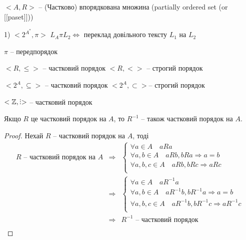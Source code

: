 $<A, R>$ -- (Частково) впорядкована множина (partially ordered set (or [[paset]]))

\begin{example}
    1) $<2^{A^*}, \pi>$ $L_A \pi L_2 \Leftrightarrow$ переклад
    довільного тексту $L_1$ на $L_2$

    $\pi$ -- передпорядок
\end{example}

\begin{example} 
    $<R, \leqslant>$ -- частковий порядок
    $<R, <>$ -- строгий порядок
\end{example}

\begin{example}
    $<2^{A}, \subseteq>$ -- частковий порядок
    $<2^{A}, \subset>$-- строгий порядок
\end{example}

\begin{example}
    $<\mathbb{Z}, \divby>$ -- частковий порядок
\end{example}

\begin{claim}
    Якщо $R$ це частковий порядок на $A$, то $R^{-1}$
    -- також частковий порядок на $A$.
\end{claim}
\begin{proof}
    Нехай $R$ -- частковий порядок на $A$, тоді
    $$\begin{array}{rcl}
        R \text{ -- частковий порядок на } A
        & \Rightarrow & \left\{ \begin{array}{l}
            \forall a \in A \quad aRa \\
            \forall a, b \in A \quad aRb, bRa \Rightarrow a = b \\
            \forall a, b, c \in A \quad aRb, bRc \Rightarrow aRc \\
        \end{array} \right.  \\
        & \Rightarrow & \left\{ \begin{array}{l}
            \forall a \in A \quad aR^{-1}a \\
            \forall a, b \in A \quad aR^{-1}b, bR^{-1}a \Rightarrow a = b \\
            \forall a, b, c \in A \quad aR^{-1}b, bR^{-1}c \Rightarrow aR^{-1}c \\
        \end{array} \right.  \\
        & \Rightarrow & R^{-1} \text{ -- частковий порядок} \\
    \end{array}$$
\end{proof}

